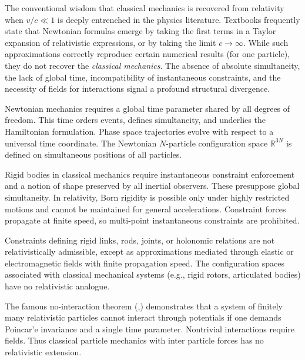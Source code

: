 The conventional wisdom that classical mechanics is recovered from relativity 
when $v/c \ll 1$ is deeply entrenched in the physics literature. Textbooks 
frequently state that Newtonian formulas emerge by taking the first terms in 
a Taylor expansion of relativistic expressions, or by taking the limit $c \to \infty$.
While such approximations correctly reproduce certain numerical results 
(for one particle), they do not recover the {\em classical mechanics}.
The absence of absolute simultaneity, the lack of global time, incompatibility 
of instantaneous constraints, and the necessity of fields for 
interactions signal a profound structural divergence.

Newtonian mechanics requires a global time parameter shared by all 
degrees of freedom. This time orders events, defines simultaneity, 
and underlies the Hamiltonian formulation. Phase space trajectories 
evolve with respect to a universal time coordinate. The Newtonian $N$-particle 
configuration space $\mathbb{R}^{3N}$ is defined on simultaneous positions of all particles.

Rigid bodies in classical mechanics require instantaneous constraint 
enforcement and a notion of shape preserved by all inertial observers. 
These presuppose global simultaneity. In relativity, Born rigidity 
is possible only under highly restricted motions and cannot be maintained 
for general accelerations. Constraint forces propagate at finite speed, 
so multi-point instantaneous constraints are prohibited.

Constraints defining rigid links, rods, joints, or holonomic relations 
are not relativistically admissible, except as approximations mediated 
through elastic or electromagnetic fields with finite propagation speed. 
The configuration spaces associated with classical mechanical systems 
(e.g., rigid rotors, articulated bodies) have no relativistic analogue.

The famous no-interaction theorem (\cite{CurrieJordanSudarshan1963},\cite{Leutwyler1965}) 
demonstrates that a system of finitely many relativistic particles 
cannot interact through potentials if one demands Poincar'e invariance 
and a single time parameter. Nontrivial interactions require fields. 
Thus classical particle mechanics with inter particle forces has no relativistic extension.

